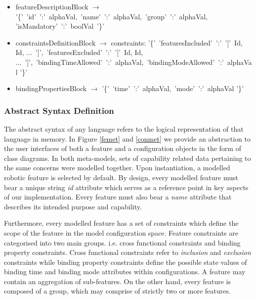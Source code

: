 \documentclass[conference]{IEEEtran}
\begin{document}
\begin{itemize}
	\item[] featureDescriptionBlock $\longrightarrow$ '\{'\ 'id'\ ':'\ alphaVal,\ 'name'\ ':'\ alphaVal,\ 'group'\ ':'\ alphaVal, 'isMandatory'\ ':'\ boolVal\ '\}' \\
	
	\item[] constraintsDefinitionBlock $\longrightarrow$ constraints: '\{'\ 'featuresIncluded'\ ':'\ '['\ Id, Id, ...\ ']',\ 'featuresExcluded'\ ':'\ '['\ Id, Id, ...\ ']',\ 'bindingTimeAllowed'\ ':'\ alphaVal,\ 'bindingModeAllowed'\ ':'\ alphaVal '\}'\\
	
	\item[] bindingPropertiesBlock $\longrightarrow$ '\{'\ 'time'\ ':'\ alphaVal,\ 'mode'\ ':'\ alphaVal '\}'\\
\end{itemize}

\subsubsection{Abstract Syntax Definition}
The abstract syntax of any language refers to the logical representation of that language in memory. In Figure \ref{femet} and \ref{conmet} we provide an abstraction to the user interfaces of both a feature and a configuration objects in the form of class diagrams. In both meta-models, sets of capability related data pertaining to the same concerns were modelled together. Upon instantiation, a modelled robotic feature is selected by default. By design, every modelled feature must bear a unique string \textit{id} attribute which serves as a reference point in key aspects of our implementation. Every feature must also bear a \textit{name} attribute that describes its intended purpose and capability.

Furthermore, every modelled feature has a set of constraints which define the scope of the feature in the model configuration space. Feature constraints are categorised into two main groups. i.e. cross functional constraints and binding property constraints. Cross functional constraints refer to \textit{inclusion} and \textit{exclusion} constraints while binding property constraints define the possible state values of binding time and binding mode attributes within configurations. A feature may contain an aggregation of sub-features. On the other hand, every feature is composed of a group, which may comprise of strictly two or more features.
\end{document}

